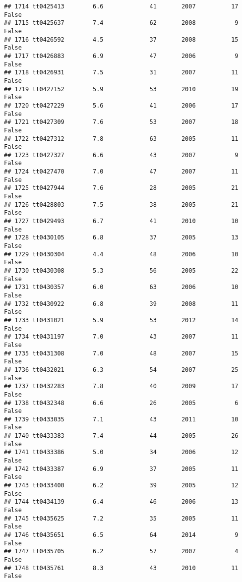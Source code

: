 \documentclass[
]{article}
\begin{document}
\begin{verbatim}
## 1714 tt0425413        6.6             41       2007          17   False
## 1715 tt0425637        7.4             62       2008           9   False
## 1716 tt0426592        4.5             37       2008          15   False
## 1717 tt0426883        6.9             47       2006           9   False
## 1718 tt0426931        7.5             31       2007          11   False
## 1719 tt0427152        5.9             53       2010          19   False
## 1720 tt0427229        5.6             41       2006          17   False
## 1721 tt0427309        7.6             53       2007          18   False
## 1722 tt0427312        7.8             63       2005          11   False
## 1723 tt0427327        6.6             43       2007           9   False
## 1724 tt0427470        7.0             47       2007          11   False
## 1725 tt0427944        7.6             28       2005          21   False
## 1726 tt0428803        7.5             38       2005          21   False
## 1727 tt0429493        6.7             41       2010          10   False
## 1728 tt0430105        6.8             37       2005          13   False
## 1729 tt0430304        4.4             48       2006          10   False
## 1730 tt0430308        5.3             56       2005          22   False
## 1731 tt0430357        6.0             63       2006          10   False
## 1732 tt0430922        6.8             39       2008          11   False
## 1733 tt0431021        5.9             53       2012          14   False
## 1734 tt0431197        7.0             43       2007          11   False
## 1735 tt0431308        7.0             48       2007          15   False
## 1736 tt0432021        6.3             54       2007          25   False
## 1737 tt0432283        7.8             40       2009          17   False
## 1738 tt0432348        6.6             26       2005           6   False
## 1739 tt0433035        7.1             43       2011          10   False
## 1740 tt0433383        7.4             44       2005          26   False
## 1741 tt0433386        5.0             34       2006          12   False
## 1742 tt0433387        6.9             37       2005          11   False
## 1743 tt0433400        6.2             39       2005          12   False
## 1744 tt0434139        6.4             46       2006          13   False
## 1745 tt0435625        7.2             35       2005          11   False
## 1746 tt0435651        6.5             64       2014           9   False
## 1747 tt0435705        6.2             57       2007           4   False
## 1748 tt0435761        8.3             43       2010          11   False

\end{verbatim}
\end{document}
